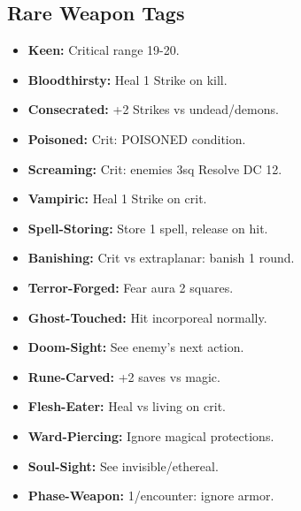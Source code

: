 \documentclass[10pt,twoside]{article}
\begin{document}
\vspace{0.5cm}

\subsection{Rare Weapon Tags}
\begin{minipage}[t]{0.48\textwidth}
\begin{itemize}[leftmargin=0.3cm, itemsep=0.1cm]
\item \textcolor{rarecolor}{\textbf{Keen:}} \textcolor{rarecolor}{Critical range 19-20.}
\item \textcolor{rarecolor}{\textbf{Bloodthirsty:}} \textcolor{rarecolor}{Heal 1 Strike on kill.}
\item \textcolor{rarecolor}{\textbf{Consecrated:}} \textcolor{rarecolor}{+2 Strikes vs undead/demons.}
\item \textcolor{rarecolor}{\textbf{Poisoned:}} \textcolor{rarecolor}{Crit: POISONED condition.}
\item \textcolor{rarecolor}{\textbf{Screaming:}} \textcolor{rarecolor}{Crit: enemies 3sq Resolve DC 12.}
\item \textcolor{rarecolor}{\textbf{Vampiric:}} \textcolor{rarecolor}{Heal 1 Strike on crit.}
\item \textcolor{rarecolor}{\textbf{Spell-Storing:}} \textcolor{rarecolor}{Store 1 spell, release on hit.}
\item \textcolor{rarecolor}{\textbf{Banishing:}} \textcolor{rarecolor}{Crit vs extraplanar: banish 1 round.}
\item \textcolor{rarecolor}{\textbf{Terror-Forged:}} \textcolor{rarecolor}{Fear aura 2 squares.}
\item \textcolor{rarecolor}{\textbf{Ghost-Touched:}} \textcolor{rarecolor}{Hit incorporeal normally.}
\item \textcolor{rarecolor}{\textbf{Doom-Sight:}} \textcolor{rarecolor}{See enemy's next action.}
\item \textcolor{rarecolor}{\textbf{Rune-Carved:}} \textcolor{rarecolor}{+2 saves vs magic.}
\item \textcolor{rarecolor}{\textbf{Flesh-Eater:}} \textcolor{rarecolor}{Heal vs living on crit.}
\item \textcolor{rarecolor}{\textbf{Ward-Piercing:}} \textcolor{rarecolor}{Ignore magical protections.}
\item \textcolor{rarecolor}{\textbf{Soul-Sight:}} \textcolor{rarecolor}{See invisible/ethereal.}
\item \textcolor{rarecolor}{\textbf{Phase-Weapon:}} \textcolor{rarecolor}{1/encounter: ignore armor.}
\end{itemize}
\end{minipage}
\end{document}

